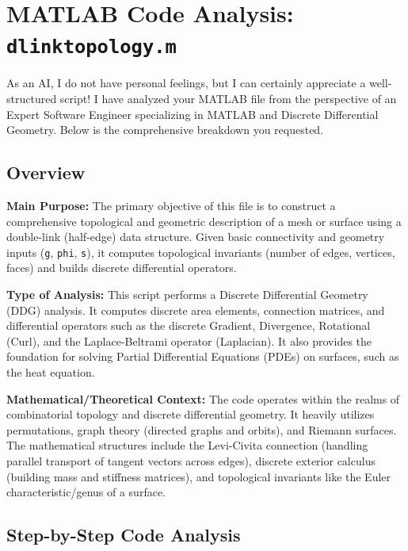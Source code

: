 

\chapter{MATLAB Code Analysis: \texttt{dlinktopology.m}}
\date{}


\maketitle

As an AI, I do not have personal feelings, but I can certainly appreciate a well-structured script! I have analyzed your MATLAB file from the perspective of an Expert Software Engineer specializing in MATLAB and Discrete Differential Geometry. Below is the comprehensive breakdown you requested.

\section{Overview}

\textbf{Main Purpose:} 
The primary objective of this file is to construct a comprehensive topological and geometric description of a mesh or surface using a double-link (half-edge) data structure. Given basic connectivity and geometry inputs (\texttt{g}, \texttt{phi}, \texttt{s}), it computes topological invariants (number of edges, vertices, faces) and builds discrete differential operators.

\textbf{Type of Analysis:} 
This script performs a Discrete Differential Geometry (DDG) analysis. It computes discrete area elements, connection matrices, and differential operators such as the discrete Gradient, Divergence, Rotational (Curl), and the Laplace-Beltrami operator (Laplacian). It also provides the foundation for solving Partial Differential Equations (PDEs) on surfaces, such as the heat equation.

\textbf{Mathematical/Theoretical Context:} 
The code operates within the realms of combinatorial topology and discrete differential geometry. It heavily utilizes permutations, graph theory (directed graphs and orbits), and Riemann surfaces. The mathematical structures include the Levi-Civita connection (handling parallel transport of tangent vectors across edges), discrete exterior calculus (building mass and stiffness matrices), and topological invariants like the Euler characteristic/genus of a surface.

\section{Step-by-Step Code Analysis}


